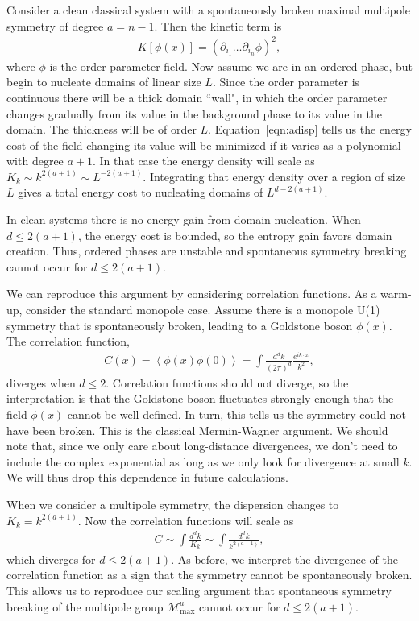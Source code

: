 \documentclass[pra,aps,twocolumn, amsfonts,amsmath,amssymb,nofootinbib,superscriptaddress]{revtex4}
\renewcommand{\max}{\text{max}}
\begin{document}
Consider a clean classical system with a spontaneously broken maximal multipole symmetry of degree $a=n-1$.
Then the kinetic term is
\begin{align}
K[\phi(x)] = (\partial_{i_1} \dots \partial_{i_n} \phi)^2, \label{eqn:adisp}
\end{align} 
where $\phi$ is the order parameter field. 
Now assume we are in an ordered phase, but begin to nucleate domains of linear size $L$. Since the order parameter is continuous there will be a thick domain ``wall", in which the order parameter changes gradually from its value in the background phase to its value in the domain. The thickness will be of order $L$.
Equation~\ref{eqn:adisp} tells us the  energy cost of the field changing its value will be minimized if it varies as a polynomial with degree $a+1$. In that case the energy density will scale as $K_k \sim k^{2(a+1)} \sim L^{-2(a+1)}$. Integrating that energy density over a region of size $L$ gives a total energy cost to nucleating domains of $L^{d-2(a+1)}$.

In clean systems there is no energy gain from domain nucleation. When $d\le2(a+1)$, the energy cost is bounded, so the entropy gain favors domain creation. Thus, ordered phases are unstable and spontaneous symmetry breaking cannot occur for $d\le2(a+1)$.

We can reproduce this argument by considering correlation functions. As a warm-up, consider the standard monopole case. Assume there is a monopole U(1) symmetry that is spontaneously broken, leading to a Goldstone boson $\phi(x)$. The correlation function,
\begin{align}
C(x) = \left\langle \phi(x) \phi(0) \right\rangle = \int \frac{d^dk}{(2\pi)^d} \frac{e^{i k \cdot x}}{k^2}, 
\end{align}
diverges when $d\le 2$. Correlation functions should not diverge, so the interpretation is that the Goldstone boson fluctuates strongly enough that the field $\phi(x)$ cannot be well defined. In turn, this tells us the symmetry could not have been broken. This is the classical Mermin-Wagner argument. We should note that, since we only care about long-distance divergences, we don't need to include the complex exponential as long as we only look for divergence at small $k$. We will thus drop this dependence in future calculations. 

When we consider a multipole symmetry, the dispersion changes to $K_k=k^{2(a+1)}$. Now the correlation functions will scale as 
\begin{align}
C \sim \int \frac{d^dk}{K_k} \sim \int \frac{d^dk}{k^{2(a+1)}}, \label{eqn:correl}
\end{align}
which diverges for $d\le2(a+1)$. As before, we interpret the divergence of the correlation function as a sign that the symmetry cannot be spontaneously broken. This allows us to reproduce our scaling argument that spontaneous symmetry breaking of the multipole group $\mathcal{M}^a_\max$ cannot occur for $d\le2(a+1)$.
\end{document}
